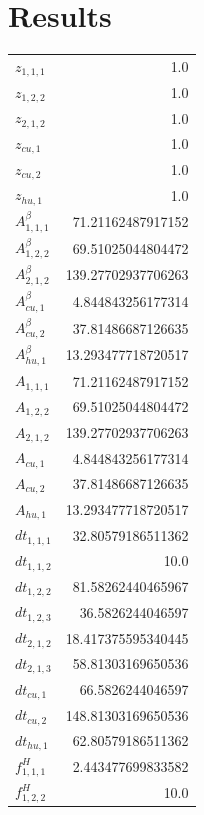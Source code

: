 \documentclass{article}%
\makeatletter
\let\mcnewpage=\newpage%
\newcommand{\TrickSupertabularIntoMulticols}{%
\renewcommand\newpage{%
\if@firstcolumn%
\hrule width\linewidth height0pt%
\columnbreak%
\else%
\mcnewpage%
\fi%
}%
}%
\makeatother
\begin{document}
\section{Results}%
\thispagestyle{plain}%
\begin{multicols*}{3}%
\TrickSupertabularIntoMulticols%
%
\begin{supertabular}{lr}%
	$z_{1,1,1}$ & 1.0 \\%
	$z_{1,2,2}$ & 1.0 \\%
	$z_{2,1,2}$ & 1.0 \\%
	$z_{cu,1}$ & 1.0 \\%
	$z_{cu,2}$ & 1.0 \\%
	$z_{hu,1}$ & 1.0 \\%
	$A_{1,1,1}^{\beta}$ & 71.21162487917152 \\%
	$A_{1,2,2}^{\beta}$ & 69.51025044804472 \\%
	$A_{2,1,2}^{\beta}$ & 139.27702937706263 \\%
	$A_{cu,1}^{\beta}$ & 4.844843256177314 \\%
	$A_{cu,2}^{\beta}$ & 37.81486687126635 \\%
	$A_{hu,1}^{\beta}$ & 13.293477718720517 \\%
	$A_{1,1,1}$ & 71.21162487917152 \\%
	$A_{1,2,2}$ & 69.51025044804472 \\%
	$A_{2,1,2}$ & 139.27702937706263 \\%
	$A_{cu,1}$ & 4.844843256177314 \\%
	$A_{cu,2}$ & 37.81486687126635 \\%
	$A_{hu,1}$ & 13.293477718720517 \\%
	$dt_{1,1,1}$ & 32.80579186511362 \\%
	$dt_{1,1,2}$ & 10.0 \\%
	$dt_{1,2,2}$ & 81.58262440465967 \\%
	$dt_{1,2,3}$ & 36.5826244046597 \\%
	$dt_{2,1,2}$ & 18.417375595340445 \\%
	$dt_{2,1,3}$ & 58.81303169650536 \\%
	$dt_{cu,1}$ & 66.5826244046597 \\%
	$dt_{cu,2}$ & 148.81303169650536 \\%
	$dt_{hu,1}$ & 62.80579186511362 \\%
	$f_{1,1,1}^{H}$ & 2.443477699833582 \\%
	$f_{1,2,2}^{H}$ & 10.0 \\%

\end{supertabular}
\end{multicols*}
\end{document}
